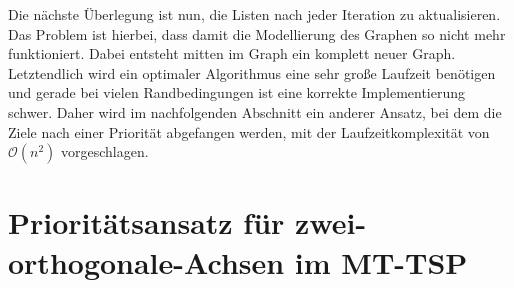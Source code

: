 \documentclass[german,version-2019-11]{uzl-thesis}
\begin{document}
Die nächste Überlegung ist nun, die Listen nach jeder Iteration zu aktualisieren. Das Problem ist hierbei, dass damit die Modellierung des Graphen so nicht mehr funktioniert. Dabei entsteht mitten im Graph ein komplett neuer Graph.  \\
Letztendlich wird ein optimaler Algorithmus eine sehr große Laufzeit benötigen und gerade bei vielen Randbedingungen ist eine korrekte Implementierung schwer. Daher wird im nachfolgenden Abschnitt ein anderer Ansatz, bei dem die Ziele nach einer Priorität abgefangen werden, mit der Laufzeitkomplexität von $\mathcal{O}(n^2)$ vorgeschlagen.

\section{Prioritätsansatz für zwei-orthogonale-Achsen im MT-TSP}
\end{document}
